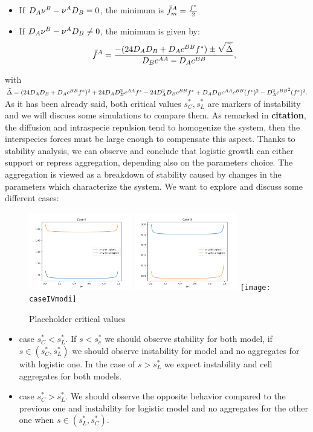 \begin{itemize}
 \item If $D_A {\nu^B} -{\nu^A} D_B=0$, the minimum is ${{\bar{f}^A}_{m}}=\frac{{f^{*}}}{2}$
 \item If $D_A {\nu^B} -{\nu^A} D_B\neq0$, the minimum is given by:
\begin{equation}
{\bar{f}^A}=\frac{-(24 D_AD_B+D_A{c^{BB}}{f^{*}}) \pm \sqrt{\widetilde{\Delta}}}{D_B{c^{AA}}-D_A{c^{BB}}}, 
\end{equation}
\end{itemize}
with $\widetilde{\Delta}=(24D_AD_B+D_A{c^{BB}} {f^{*}})^2+24D_AD_B^{2}{c^{AA}}{f^{*}}-24D_A^2D_B{c^{BB}}{f^{*}}+D_A D_B {c^{AA}} {c^{BB}}({f^{*}})^{2}-D_A^{2} {c^{BB}}^2 ({f^{*}})^2.  $
\noindent As it has been already said, both critical values $s^{*}_C, s^{*}_L$ are markers of instability and we will discuss some simulations to compare them. As remarked in \textbf{citation}, the diffusion and intraspecie repulsion tend to homogenize the system, then the interspecies forces must be large enough to compensate this aspect. Thanks to stability analysis, we can observe and conclude that logistic growth can either support or repress aggregation, depending also on the parameters choice. The aggregation is viewed as a breakdown of stability caused by changes in the parameters which characterize the system.
We want to explore and discuss some different cases:
\begin{figure}
	\includegraphics[width=4.5cm]{sstar_caseII}
	\includegraphics[width=4.5cm]{sstar_caseIII}
	\texttt{[image: caseIVmodi]}
	\caption{Placeholder critical values}
\end{figure}


\begin{itemize}
	\item case $s^{*}_{C}<s^*_{L}$. If $s< s^{*}_{c}$ we should observe stability for both model, if $s \in (s^{*}_C, s^{*}_L)$ we should observe instability for model and no aggregates for with logistic one. In the case of $s>s^{*}_{L}$ we expect instability and cell aggregates for both models. 
	\item case $s^{*}_{C}>s^*_{L}$. We should observe the opposite behavior compared to the previous one and instability for logistic model and no aggregates for the other one when  $s \in (s^{*}_L, s^{*}_C)$.
\end{itemize}


